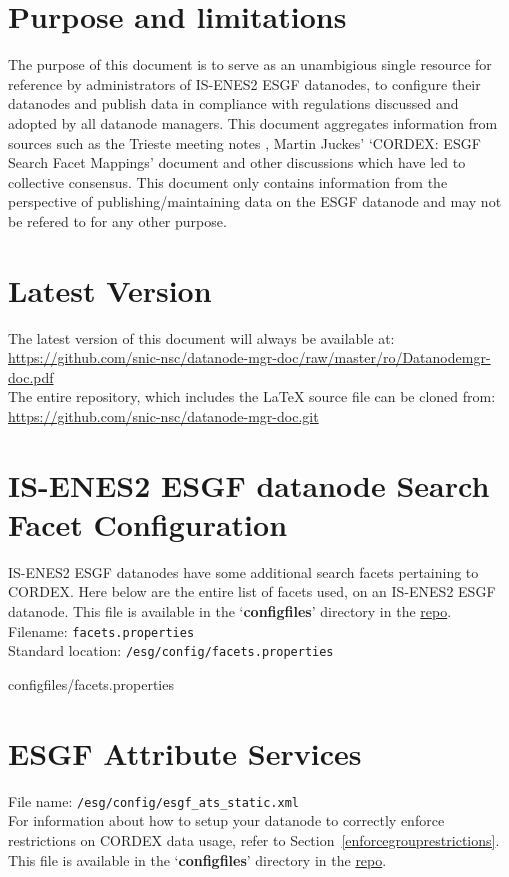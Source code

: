 \section{Purpose and limitations}
The purpose of this document is to serve as an unambigious single resource for reference by administrators of IS-ENES2 ESGF datanodes, to configure their datanodes and publish data in compliance with regulations discussed and adopted by all datanode managers. This document aggregates information from sources such as the Trieste meeting notes \cite{trieste}, Martin Juckes' `CORDEX: ESGF Search Facet Mappings' document \cite{cordexfacetsdoc} and other discussions which have led to collective consensus. This document only contains information from the perspective of publishing/maintaining data on the ESGF datanode and may not be refered to for any other purpose.

\section{Latest Version}
The latest version of this document will always be available at:\\
\url{https://github.com/snic-nsc/datanode-mgr-doc/raw/master/ro/Datanodemgr-doc.pdf} \\
The entire repository, which includes the \LaTeX{} source file can be cloned from:\\
\url{https://github.com/snic-nsc/datanode-mgr-doc.git}


\section{IS-ENES2 ESGF datanode Search Facet Configuration}
IS-ENES2 ESGF datanodes have some additional search facets pertaining to CORDEX. Here below are the entire list of facets used, on an IS-ENES2 ESGF datanode. This file is available in the `\textbf{configfiles}' directory in the \href{https://github.com/snic-nsc/datanode-mgr-doc.git}{repo}. \\
Filename: \texttt{facets.properties}\\
Standard location: \texttt{/esg/config/facets.properties}
\begin{small}
\begin{verbatimtabinput}[4]{configfiles/facets.properties}
\end{verbatimtabinput}
\end{small}
\newpage
\section{ESGF Attribute Services}
\label{attribservicesfile}
File name: \texttt{/esg/config/esgf\_ats\_static.xml}\\
For information about how to setup your datanode to correctly enforce restrictions on CORDEX data usage, refer to Section~\ref{enforcegrouprestrictions}. This file is available in the `\textbf{configfiles}' directory in the \href{https://github.com/snic-nsc/datanode-mgr-doc.git}{repo}.


